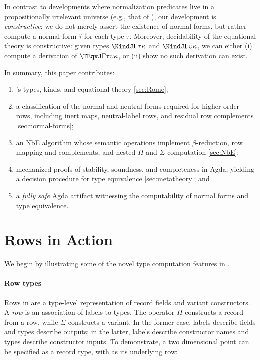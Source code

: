 In contrast to developments where normalization predicates live in a propositionally irrelevant universe (e.g., that of \citet{TooheyCJX26}), our development is \emph{constructive}: we do not merely assert the existence of normal forms, but rather compute a normal form $\hat{\tau}$ for each type $\tau$. Moreover, decidability of the equational theory is constructive: given types $\KindJ \Gamma \tau \kappa$ and $\KindJ \Gamma \upsilon \kappa$, we can either (i) compute a derivation of $\TEqvJ \Gamma \tau \upsilon \kappa$, or (ii) show no such derivation can exist.   


In summary, this paper contributes: 

\begin{enumerate}
  \item \Rome{}'s types, kinds, and equational theory \cref{sec:Rome};
  \item a classification of the normal and neutral forms required for higher-order rows, including inert maps, neutral-label rows, and residual row complements \cref{sec:normal-forms};
  \item an NbE algorithm whose semantic operations implement $\beta$-reduction, row mapping and complements, and nested $\Pi$ and $\Sigma$ computation \cref{sec:NbE};  
  \item mechanized proofs of stability, soundness, and completeness in Agda, yielding a decision procedure for \Rome{} type equivalence \cref{sec:metatheory}; and
  \item a \emph{fully safe} Agda artifact witnessing the computability of normal forms and type equivalence.
\end{enumerate}


\section{Rows in Action}
\label{sec:rows-in-action}

We begin by illustrating some of the novel type computation features in \Rome.


\paragraph{Row types} Rows in \Rome{} are a type-level representation of record fields and variant constructors.  A \emph{row} is an association of labels to types. The operator $\Pi$ constructs a record from a row, while $\Sigma$ constructs a variant. In the former case, labels describe fields and types describe outputs; in the latter, labels describe constructor names and types describe constructor inputs. To demonstrate, a two dimensional point can be specified as a record type, with  as its underlying row:

